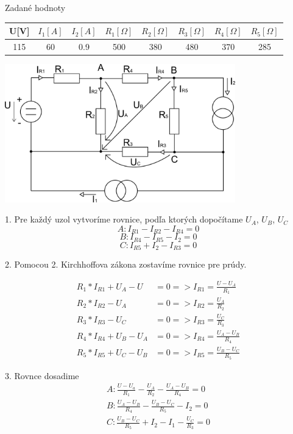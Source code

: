 \documentclass[a4paper,12pt]{article}
\begin{document}
Zadané hodnoty

\begin{tabular} {|  c | c |  c | c | c | c | c | c | }
\hline
U[V]  & $I_1 [A]$ & $I_2[A]$ & $R_1 [\Omega]$  & $R_2 [\Omega]$  &$R_3 [\Omega]$  &$R_4[\Omega]$  & $R_5[\Omega]$ \\ \hline
115 & 60 & 0.9 & 500 & 380 & 480 & 370 & 285\\ \hline
\end{tabular}
\bigskip

\includegraphics[height=6cm]{img/pr3a}

1. Pre každý uzol vytvoríme rovnice, podľa ktorých dopočítame $U_A$, $U_B$, $U_C$
\begin{equation*}
A: I_{R1} - I_{R2} - I_{R4} = 0
\end{equation*}
\begin{equation*}
B: I_{R4} - I_{R5} - I_2 = 0
\end{equation*}
\begin{equation*}
C: I_{R5} + I_2 - I_{R3} = 0
\end{equation*}

2. Pomocou 2. Kirchhoffova zákona zostavíme rovnice pre prúdy.

\begin{equation*}
\begin{split}
R_1 * I_{R1} + U_A - U &= 0 => I_{R1} = \frac{U-U_A}{R_1} \\
R_2 * I_{R2} - U_A&= 0 =>I_{R2} = \frac{U_A}{R_2} \\
R_3 * I_{R3} - U_C &=0 => I_{R3} = \frac{U_C}{R_3} \\
R_4 * I_{R4}+ U_B- U_A &= 0 => I_{R4} = \frac{U_A-U_B}{R_4} \\
R_5 * I_{R5} + U_C - U_B &= 0 => I_{R5} = \frac{U_B-U_C}{R_5}
\end{split}
\end{equation*}

3. Rovnce dosadime
\begin{equation*}
    \begin{split}
	A: \frac{U-U_a}{R_1} - \frac{U_A}{R_2} - \frac{U_A-U_B}{R_4} = 0 \\
	B: \frac{U_A-U_B}{R_4} - \frac{U_B - U_C}{R_5} - I_2 = 0 \\
	C: \frac{U_B-U_C}{R_5} + I_2 - I_1 - \frac{U_C}{R_3} = 0
    \end{split}
\end{equation*}
\hrulefill
\end{document}
